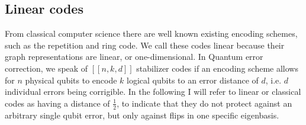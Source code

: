 


\subsection{Linear codes}
From classical computer science there are well known existing
encoding schemes, such as the repetition and ring code.
We call these codes linear because their graph representations are
linear, or one-dimensional. In Quantum error correction, we speak of $[[n,k,d]]$ stabilizer
codes if an encoding scheme allows for $n$ physical qubits to 
encode $k$ logical qubits to an error distance of $d$, i.e. $d$ individual errors 
being corrigible.
In the following I will refer to linear or classical codes as having a 
distance of $\frac{1}{2}$, to indicate that they do not protect against an
arbitrary single qubit error, but only against flips in one specific eigenbasis.


\newpage



